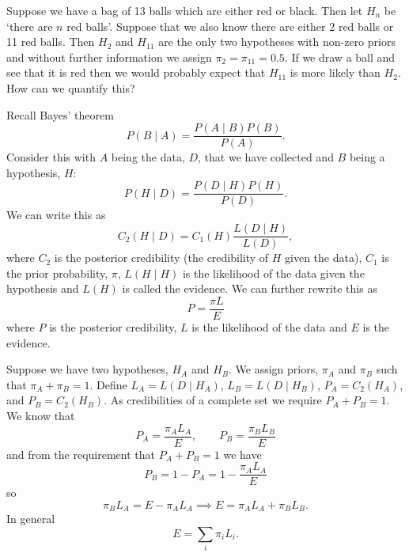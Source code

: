 \documentclass[a4paper]{article}
\newcommand{\st}{\mid}
\begin{document}
    Suppose we have a bag of 13 balls which are either red or black.
    Then let \(H_n\) be `there are \(n\) red balls'.
    Suppose that we also know there are either 2 red balls or 11 red balls.
    Then \(H_2\) and \(H_{11}\) are the only two hypotheses with non-zero priors and without further information we assign \(\pi_2 = \pi_{11} = 0.5\).
    If we draw a ball and see that it is red then we would probably expect that \(H_{11}\) is more likely than \(H_2\).
    How can we quantify this?
    
    Recall Bayes' theorem
    \[P(B\st A) = \frac{P(A\st B)P(B)}{P(A)}.\]
    Consider this with \(A\) being the data, \(D\), that we have collected and \(B\) being a hypothesis, \(H\):
    \[P(H\st D) = \frac{P(D\st H)P(H)}{P(D)}.\]
    We can write this as
    \[C_2(H\st D) = C_1(H)\frac{L(D\st H)}{L(D)},\]
    where \(C_2\) is the posterior credibility (the credibility of \(H\) given the data), \(C_1\) is the prior probability, \(\pi\), \(L(H\st H)\) is the likelihood of the data given the hypothesis and \(L(H)\) is called the evidence.
    We can further rewrite this as
    \[P = \frac{\pi L}{E}\]
    where \(P\) is the posterior credibility, \(L\) is the likelihood of the data and \(E\) is the evidence.
    
    Suppose we have two hypotheses, \(H_A\) and \(H_B\).
    We assign priors, \(\pi_A\) and \(\pi_B\) such that \(\pi_A + \pi_B = 1\).
    Define \(L_A = L(D\st H_A)\), \(L_B = L(D\st H_B)\), \(P_A = C_2(H_A)\), and \(P_B = C_2(H_B)\).
    As credibilities of a complete set we require \(P_A + P_B = 1\).
    We know that
    \[P_A = \frac{\pi_A L_A}{E}, \qquad P_B = \frac{\pi_B L_B}{E}\]
    and from the requirement that \(P_A + P_B = 1\) we have
    \[P_B = 1 - P_A = 1 - \frac{\pi_A L_A}{E}\]
    so
    \[\pi_BL_A = E - \pi_AL_A \implies E = \pi_AL_A + \pi_BL_B.\]
    In general
    \[E = \sum_{i} \pi_iL_i.\]
    
\end{document}
